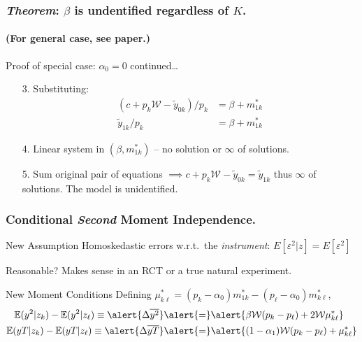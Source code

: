\documentclass{beamer}
\begin{document}
\begin{frame}
  \frametitle{\emph{Theorem}: $\beta$ is undentified regardless of $K$.}
  \framesubtitle{(For general case, see paper.)}
  \begin{block}{Proof of special case: $\alpha_0 = 0$ continued\dots }
    \begin{enumerate}
      \item[3.] Substituting: 
    \vspace{0.5em}
\begin{align*}
  (c + p_k \mathcal{W} - \widetilde{y}_{0k})/p_k &=\beta + m_{1k}^* \\
  \widetilde{y}_{1k}/p_k &= \beta + m_{1k}^*
\end{align*}
\item[4.] Linear system in $(\beta, m_{1k}^*)$ -- no solution or $\infty$ of solutions.
\item[5.] Sum original pair of equations $\implies c + p_k \mathcal{W} - \widetilde{y}_{0k} = \widetilde{y}_{1k}$ thus $\infty$ of solutions.
  The model is unidentified.
    \end{enumerate}
  \end{block} 
    
\end{frame}
\begin{frame}
  \frametitle{Conditional \emph{Second} Moment Independence.} 
  \begin{block}{New Assumption}
    Homoskedastic errors w.r.t.\ the \emph{instrument}: $E[\varepsilon^2|z]=E[\varepsilon^2]$
  \end{block}
  \begin{block}{Reasonable?}
    Makes sense in an RCT or a true natural experiment.
  \end{block}
  \begin{alertblock}{New Moment Conditions}
  Defining
    $\mu_{k\ell}^* =  (p_k - \alpha_0) m_{1k}^* - (p_{\ell}-\alpha_0)m_{k\ell}^*$, 
  \begin{align*}
    \mathbb{E}(y^2|z_k) - \mathbb{E}(y^2|z_\ell) \equiv \alert{\Delta\overline{y^2}} &\alert{=}  \alert{\beta \mathcal{W} (p_k - p_\ell)  + 2 \mathcal{W} \mu_{k\ell}^*}\\
    \mathbb{E}(yT|z_k) - \mathbb{E}(yT|z_\ell) \equiv \alert{ \Delta\overline{yT}} &\alert{=} \alert{(1-\alpha_1)\mathcal{W}(p_k - p_\ell) + \mu_{k\ell}^*}
  \end{align*}
  \end{alertblock}
\end{frame}
\end{document}
